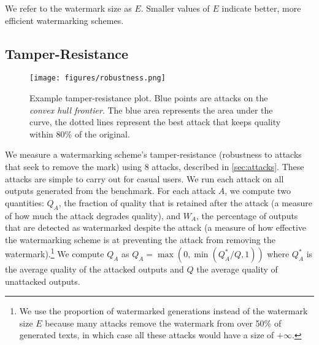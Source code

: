 %
%
%
%
%

We refer to the watermark size as $E$.
Smaller values of $E$ indicate better, more efficient watermarking schemes.

\subsection{Tamper-Resistance}

\begin{figure}[t]
\texttt{[image: figures/robustness.png]}
\centering
\caption{Example tamper-resistance plot. Blue points are attacks on the \emph{convex hull frontier}. The blue area represents the area under the curve, the dotted lines represent the best attack that keeps quality 
within 80\% of the original. }\label{robustness-example-fig}
\end{figure}

We measure a watermarking scheme's tamper-resistance (robustness to attacks that seek to remove the mark) using 8 attacks, described in \cref{sec:attacks}.
%
These attacks are simple to carry out for casual users.
%
We run each attack on all outputs generated from the benchmark.
For each attack $A$, we compute two quantities:
$Q_A$, the fraction of quality that is retained after the attack
(a measure of how much the attack degrades quality),
and $W_A$, the percentage of outputs that are detected
as watermarked despite the attack (a measure of how effective the
watermarking scheme is at preventing the attack from
removing the watermark).\footnote{We use the proportion of 
watermarked generations instead of the watermark size $E$
because many attacks remove 
the watermark from over 50\% of generated texts, in which case all these 
attacks would have a size of $+\infty$.}
We compute $Q_A$ as $Q_A=\max(0,\min(Q^*_A/Q,1))$ where
$Q^*_A$ is the average quality of the attacked outputs and
$Q$ the average quality of unattacked outputs.

